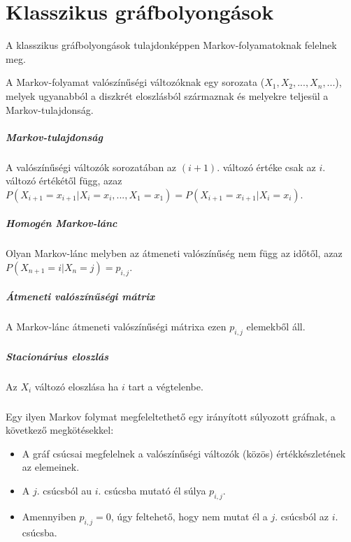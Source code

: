 \chapter{Klasszikus gráfbolyongások}

A klasszikus gráfbolyongások tulajdonképpen Markov-folyamatoknak felelnek meg.

A Markov-folyamat valószínűségi változóknak egy sorozata ($X_1, X_2, ..., X_n, ...$),
melyek ugyanabból a diszkrét eloszlásból származnak és melyekre teljesül a
Markov-tulajdonság.

\paragraph{Markov-tulajdonság} A valószínűségi változók sorozatában
az $(i+1).$ változó értéke csak az $i.$ változó értékétől függ, azaz
$P(X_{i+1} = x_{i+1} | X_i = x_i, ..., X_1 = x_1) = P(X_{i+1} = x_{i+1} | X_i = x_i)$.

\paragraph{Homogén Markov-lánc} Olyan Markov-lánc melyben az átmeneti
valószínűség nem függ az időtől, azaz $P(X_{n+1} = i | X_n = j) = p_{i,j}$.

\paragraph{Átmeneti valószínűségi mátrix}
A Markov-lánc átmeneti valószínűségi mátrixa ezen $p_{i,j}$ elemekből áll.

\paragraph{Stacionárius eloszlás} Az $X_i$ változó eloszlása ha $i$ tart
a végtelenbe.

\paragraph{}

Egy ilyen Markov folymat megfeleltethető egy irányított súlyozott gráfnak,
a következő megkötésekkel:
\begin{itemize}
  \item A gráf csúcsai megfelelnek a valószínűségi változók (közös)
        értékkészletének az elemeinek.
  \item A $j.$ csúcsból au $i.$ csúcsba mutató él súlya $p_{i,j}$.
  \item Amennyiben $p_{i,j}=0$, úgy feltehető, hogy nem mutat él a $j.$
        csúcsból az $i.$ csúcsba.
\end{itemize}

